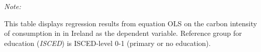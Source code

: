 \begin{table}[htbp!]
\begin{adjustbox}{width = 1\textwidth, max height = 0.95\textheight, center}
\begin{threeparttable}[b]
         \begin{tablenotes}\item \medskip \textit{Note:}
            \item This table displays regression results from equation OLS on the carbon intensity of consumption in  in Ireland as the dependent variable. Reference group for education (\textit{ISCED}) is ISCED-level 0-1 (primary or no education).
         \end{tablenotes}
      \end{threeparttable}
   \end{adjustbox}
\end{table}


